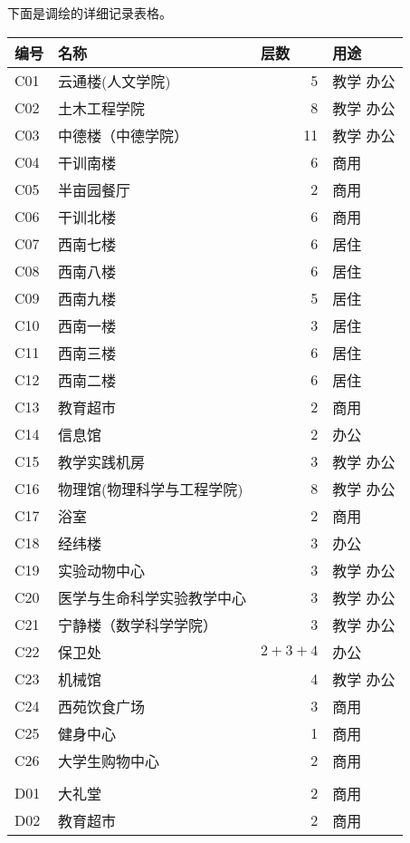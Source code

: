 下面是调绘的详细记录表格。
\begin{center}

\begin{longtable}{|l|l|r|l|}

\hline 编号 & 名称 & \multicolumn{1}{l|}{层数} & 用途 \\ \hline
\endhead
\hline
\endfoot

C01 & 云通楼(人文学院) & 5  & 教学 办公 \\
C02 & 土木工程学院 & 8  & 教学 办公 \\
C03 & 中德楼（中德学院） & 11 & 教学 办公 \\
C04 & 干训南楼 & 6  & 商用  \\
C05 & 半亩园餐厅 & 2  & 商用  \\
C06 & 干训北楼 & 6  & 商用  \\
C07 & 西南七楼 & 6  & 居住 \\
C08 & 西南八楼 & 6  & 居住 \\
C09 & 西南九楼 & 5  & 居住 \\
C10 & 西南一楼 & 3  & 居住 \\
C11 & 西南三楼 & 6  & 居住 \\
C12 & 西南二楼 & 6  & 居住 \\
C13 & 教育超市 & 2  & 商用  \\
C14 & 信息馆 & 2  & 办公 \\
C15 & 教学实践机房 & 3  & 教学 办公 \\
C16 & 物理馆(物理科学与工程学院) & 8  & 教学 办公 \\
C17 & 浴室 & 2  & 商用  \\
C18 & 经纬楼 & 3  & 办公 \\
C19 & 实验动物中心 & 3  & 教学 办公 \\
C20 & 医学与生命科学实验教学中心 & 3  & 教学 办公 \\
C21 & 宁静楼（数学科学学院） & 3  & 教学 办公 \\
C22 & 保卫处 & $2+3+4$ & 办公 \\
C23 & 机械馆 & 4  & 教学 办公 \\
C24 & 西苑饮食广场 & 3  & 商用  \\
C25 & 健身中心 & 1  & 商用  \\
C26 & 大学生购物中心 & 2  & 商用  \\
    &    &    &  \\
D01 & 大礼堂 & 2  & 商用  \\
D02 & 教育超市 & 2  & 商用  \\

\end{longtable}
\end{center}
